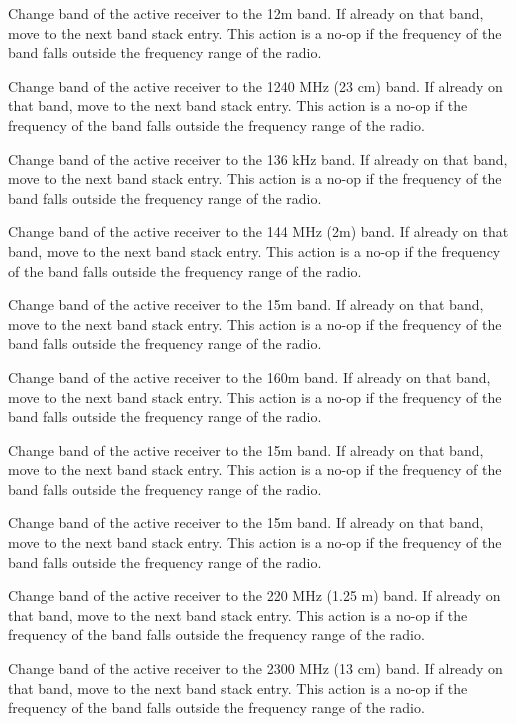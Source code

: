 \documentclass[12pt]{book}
\begin{document}
{Change band of the active receiver to the 12m band. If already on that band, move to
the next band stack entry. This action is a no-op if the frequency of the band falls outside the frequency range
of the radio.}

{Change band of the active receiver to the 1240 MHz (23 cm) band. If already on that band, move to
the next band stack entry. This action is a no-op if the frequency of the band falls outside the frequency
range of the radio.}

{Change band of the active receiver to the 136 kHz
band. If already on that band, move to the next band stack entry.
This action is a no-op if the frequency of the band falls outside the frequency
range of the radio.}

{Change band of the active receiver to the 144 MHz (2m) band. If already on that band, move to
the next band stack entry. This action is a no-op if the frequency of the band falls outside the frequency
range of the radio.}

{Change band of the active receiver to the 15m band. If already on that band, move to
the next band stack entry. This action is a no-op if the frequency of the band falls outside the frequency
range of the radio.}

{Change band of the active receiver to the 160m band. If already on that band, move to
the next band stack entry. This action is a no-op if the frequency of the band falls outside the frequency
range of the radio.}

{Change band of the active receiver to the 15m band. If already on that band, move to
the next band stack entry. This action is a no-op if the frequency of the band falls outside the frequency
range of the radio.}

{Change band of the active receiver to the 15m band. If already on that band, move to
the next band stack entry. This action is a no-op if the frequency of the band falls outside the frequency
range of the radio.}

{Change band of the active receiver to the 220 MHz (1.25 m) band. If already on that band, move to
the next band stack entry. This action is a no-op if the frequency of the band falls outside the frequency
range of the radio.}

{Change band of the active receiver to the 2300 MHz (13 cm) band. If already on that band, move to
the next band stack entry. This action is a no-op if the frequency of the band falls outside the frequency
range of the radio.}
\end{document}
